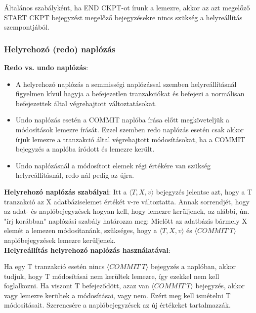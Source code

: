\documentclass[margin=0px]{article}
\begin{document}
	Általános szabályként, ha END CKPT-ot írunk a lemezre, akkor az azt megelőző START CKPT bejegyzést megelőző
	bejegyzésekre nincs szükség a helyreállítás szempontjából. 
	
	\subsubsection{Helyrehozó (redo) naplózás}
	
	\noindent \textbf{Redo vs. undo naplózás}:
	\begin{itemize}
		\item	A helyrehozó naplózás a semmisségi naplózással szemben helyreállításnál figyelmen kívül hagyja a befejezetlen
		tranzakciókat és befejezi a normálisan befejezettek által végrehajtott változtatásokat.
		
		\item	Undo naplózás esetén a COMMIT naplóba írása előtt megköveteljük a módosítások lemezre írását. Ezzel szemben
		redo naplózás esetén csak akkor írjuk lemezre a tranzakció által végrehajtott módosításokat, ha a COMMIT bejegyzés
		a naplóba íródott és lemezre került.
		
		\item	Undo naplózásnál a módosított elemek régi értékére van szükség helyreállításnál, redo-nál pedig az újra.
	\end{itemize}
	
	\noindent \textbf{Helyrehozó naplózás szabályai}:
	Itt a $\langle T,X,v\rangle$ bejegyzés jelentse azt, hogy a T tranzakció az X adatbáziselemet értékét v-re változtatta.
	Annak sorrendjét, hogy az adat- és naplóbejegyzések hogyan kell, hogy lemezre kerüljenek, az alábbi, ún. "írj korábban"
	naplózási szabály határozza meg: Mielőtt az adatbázis bármely X elemét a lemezen módosítanánk, szükséges, hogy
	a $\langle T,X,v\rangle$ és $\langle COMMIT \ T\rangle$ naplóbejegyzések lemezre kerüljenek.\\
	
	\noindent \textbf{Helyreállítás helyrehozó naplózás használatával}:
	
	Ha egy T tranzakció esetén nincs $\langle COMMIT \ T\rangle$ bejegyzés a naplóban, akkor tudjuk, hogy T módosításai
	nem kerültek lemezre, így ezekkel nem kell foglalkozni. Ha viszont T befejeződött, azaz van $\langle COMMIT \ T\rangle$
	bejegyzés, akkor vagy lemezre kerültek a módosításai, vagy nem. Ezért meg kell ismételni T módosításait. Szerencsére
	a naplóbejegyzések az új értékeket tartalmazzák.\\
	
\end{document}
